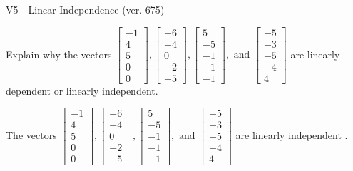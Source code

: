 \begin{exercise}
  \begin{exerciseTitle}V5 - Linear Independence (ver. 675)\end{exerciseTitle}
  \begin{exerciseStatement}
    Explain why the vectors \(\left[\begin{array}{r}
-1 \\
4 \\
5 \\
0 \\
0
\end{array}\right] , \left[\begin{array}{r}
-6 \\
-4 \\
0 \\
-2 \\
-5
\end{array}\right] , \left[\begin{array}{r}
5 \\
-5 \\
-1 \\
-1 \\
-1
\end{array}\right] , \text{ and } \left[\begin{array}{r}
-5 \\
-3 \\
-5 \\
-4 \\
4
\end{array}\right]\) are linearly dependent or linearly independent.	


  \end{exerciseStatement}
  \begin{exerciseAnswer}
   The vectors \(\left[\begin{array}{r}
-1 \\
4 \\
5 \\
0 \\
0
\end{array}\right] , \left[\begin{array}{r}
-6 \\
-4 \\
0 \\
-2 \\
-5
\end{array}\right] , \left[\begin{array}{r}
5 \\
-5 \\
-1 \\
-1 \\
-1
\end{array}\right] , \text{ and } \left[\begin{array}{r}
-5 \\
-3 \\
-5 \\
-4 \\
4
\end{array}\right]\) are 
  	 linearly independent  .
  


  \end{exerciseAnswer}
\end{exercise}